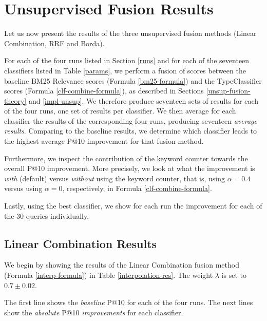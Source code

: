 \section{Unsupervised Fusion Results}
Let us now present the results of the three unsupervised fusion methods (Linear Combination, RRF and Borda).

For each of the four runs listed in Section \ref{runs} and for each of the seventeen classifiers listed in Table \ref{params},
we perform a fusion of scores
between the baseline BM25 \textsf{Relevance} scores (Formula \ref{bm25-formula})
and the \textsf{TypeClassifier} scores (Formula \ref{clf-combine-formula}), as described in Sections \ref{unsup-fusion-theory}
and \ref{impl-unsup}.
We therefore produce seventeen sets of results for each of the four runs,
one set of results per classifier.
We then average for each classifier the results of the corresponding four runs, producing seventeen \emph{average results}.
Comparing to the baseline results,
we determine which classifier leads to the highest average P@10 improvement for that fusion method.

Furthermore, we inspect the contribution of the keyword counter towards the overall P@10 improvement. More precisely,
we look at what the improvement is \emph{with} (default) versus \emph{without} using the keyword counter, that is, using $\alpha=0.4$
versus using $\alpha=0$, respectively, in Formula \ref{clf-combine-formula}.

Lastly, using the best classifier, we show for each run the improvement for each of the 30 queries individually.

\subsection{Linear Combination Results}
We begin by showing the results of the Linear Combination fusion method (Formula \ref{interp-formula}) in Table \ref{interpolation-res}.
The weight $\lambda$ is set to $0.7\pm 0.02$.

The first line shows the \emph{baseline} P@10 for each of the four runs.
The next lines show the \emph{absolute} P@10 \emph{improvements} for each classifier.

